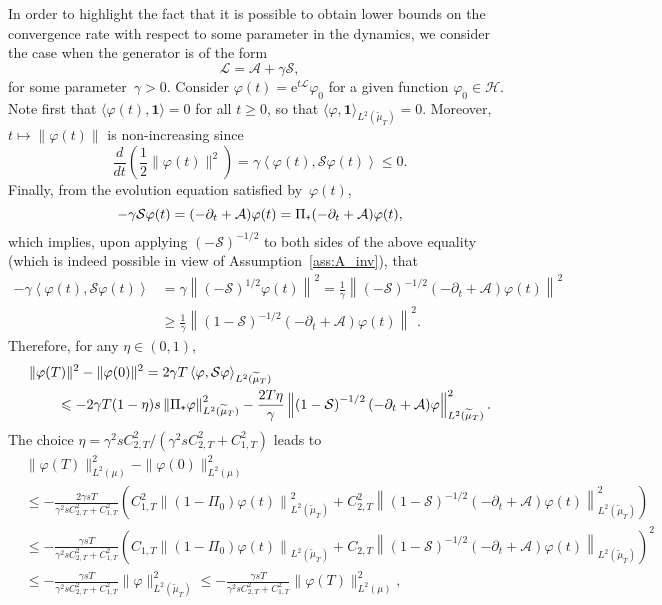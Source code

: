 \documentclass{article}
\newcommand{\rme}{\mathrm{e}}
\newcommand{\cL}{\mathcal{L}}
\newcommand{\cLs}{\mathcal{S}}
\newcommand{\cLa}{\mathcal{A}}
\newcommand{\cH}{\mathcal{H}}
\newcommand{\subplus}{\textnormal{\texttt{+}}}
\renewcommand{\leq}{\leqslant}
\renewcommand{\geq}{\geqslant}
\begin{document}
In order to highlight the fact that it is possible to obtain lower bounds on the convergence rate with respect to some parameter in the dynamics, we consider the case when the generator is of the form
\[
  \cL = \cLa + \gamma \cLs,
  \]
  for some parameter~$\gamma > 0$.
Consider $\varphi(t) = \rme^{t \cL} \varphi_0$ for a given function $\varphi_0 \in \cH$. Note first that $\langle \varphi(t),\mathbf{1}\rangle = 0$ for all $t \geq 0$, so that $\langle \varphi,\mathbf{1}\rangle_{L^2(\widetilde{\mu}_T)} = 0$. Moreover, $t \mapsto \|\varphi(t)\|$ is non-increasing since
\[
\frac{d}{dt}\left(\frac12 \|\varphi(t)\|^2\right) = \gamma \left\langle\varphi(t),\cLs\varphi(t)\right\rangle \leq 0.
\]
Finally, from the evolution equation satisfied by~$\varphi(t)$,
\[
-\gamma \cLs \varphi(t) = (-\partial_t + \cLa) \varphi(t) = \Pi_\subplus(-\partial_t + \cLa) \varphi(t),
\]
which implies, upon applying $(-\cLs)^{-1/2}$ to both sides of the above equality (which is indeed possible in view of Assumption~\ref{ass:A_inv}), that
\[
\begin{aligned}
  -\gamma \left\langle\varphi(t),\cLs\varphi(t)\right\rangle & = \gamma \left\| (-\cLs)^{1/2} \varphi(t) \right\|^2 = \frac1\gamma \left\| (-\cLs)^{-1/2}(-\partial_t + \cLa)\varphi(t)\right\|^2\\
  & \geq \frac1\gamma \left\| (1-\cLs)^{-1/2}(-\partial_t + \cLa)\varphi(t)\right\|^2.
\end{aligned}
\]
Therefore, for any $\eta \in (0,1)$,
\[
  \begin{aligned}
    &   \|\varphi(T)\|^2 - \|\varphi(0)\|^2  = 2\gamma T \left\langle\varphi,\cLs\varphi \right\rangle_{L^2(\widetilde{\mu}_T)} \\
  & \qquad \leq - 2\gamma T(1-\eta)s \left\| \Pi_\subplus \varphi \right\|_{L^2(\widetilde{\mu}_T)}^2 - \frac{2T\eta}{\gamma} \left\| \left(1-\cLs\right)^{-1/2}(-\partial_t + \cLa) \varphi \right\|_{L^2(\widetilde{\mu}_T)}^2.
  \end{aligned}
\]
The choice $\eta = \gamma^2 s C_{2,T}^2/(\gamma^2 sC_{2,T}^2 + C_{1,T}^2)$ leads to
\[
\begin{aligned}
& \|\varphi(T)\|_{L^2(\mu)}^2 - \|\varphi(0)\|_{L^2(\mu)}^2 \\
& \leq -\frac{2\gamma sT}{\gamma^2 sC_{2,T}^2 + C_{1,T}^2} \left( C_{1,T}^2 \left\| (1-\Pi_0) \varphi(t) \right\|_{L^2(\widetilde{\mu}_T)}^2 + C_{2,T}^2\left\| \left(1-\cLs\right)^{-1/2}(-\partial_t + \cLa) \varphi(t) \right\|_{L^2(\widetilde{\mu}_T)}^2\right) \\
& \leq -\frac{\gamma sT}{\gamma^2 sC_{2,T}^2 + C_{1,T}^2} \left( C_{1,T} \left\| (1-\Pi_0) \varphi(t) \right\|_{L^2(\widetilde{\mu}_T)} + C_{2,T}\left\| \left(1-\cLs\right)^{-1/2}(-\partial_t + \cLa) \varphi(t) \right\|_{L^2(\widetilde{\mu}_T)}\right)^2 \\
& \leq -\frac{\gamma sT}{\gamma^2 sC_{2,T}^2 + C_{1,T}^2} \|\varphi\|_{L^2(\widetilde{\mu}_T)}^2 \leq -\frac{\gamma s T}{\gamma^2 sC_{2,T}^2 + C_{1,T}^2} \|\varphi(T)\|_{L^2(\mu)}^2,
\end{aligned}
\]
\end{document}
